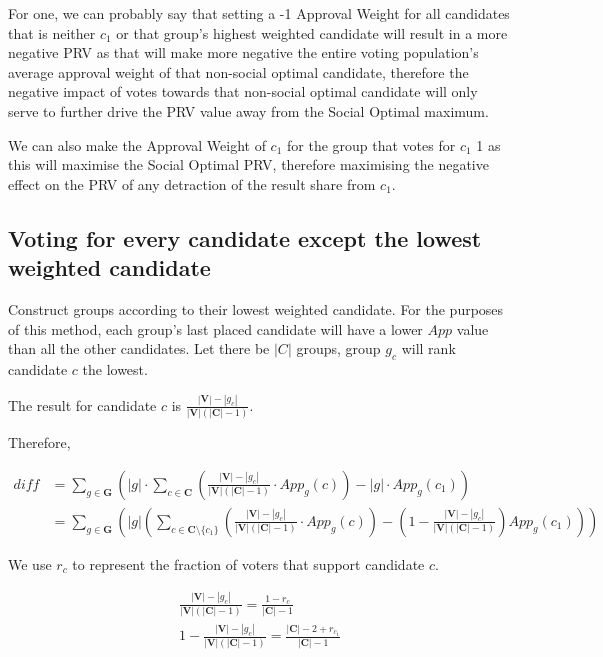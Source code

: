 \documentclass{article}
\begin{document}
For one, we can probably say that setting a -1 Approval Weight for all candidates that is neither $c_1$ or that group's highest weighted candidate will result in a more negative PRV as that will make more negative the entire voting population's average approval weight of that non-social optimal candidate, therefore the negative impact of votes towards that non-social optimal candidate will only serve to further drive the PRV value away from the Social Optimal maximum.

We can also make the Approval Weight of $c_1$ for the group that votes for $c_1$ 1 as this will maximise the Social Optimal PRV, therefore maximising the negative effect on the PRV of any detraction of the result share from $c_1$.


\subsection{Voting for every candidate except the lowest weighted candidate}

Construct groups according to their lowest weighted candidate. For the purposes of this method, each group's last placed candidate will have a lower $App$ value than all the other candidates. Let there be $|C|$ groups, group $g_c$ will rank candidate $c$ the lowest.

The result for candidate $c$ is $\frac{|\boldsymbol{V}|-|g_c|}{|\boldsymbol{V}|(|\boldsymbol{C}|-1)}$.

Therefore,

\begin{equation}
\begin{aligned}
diff &= \sum^{}_{g \in \boldsymbol{G}}{\left(|g| \cdot \sum^{}_{c \in \boldsymbol{C}}{\left(\frac{|\boldsymbol{V}|-|g_c|}{|\boldsymbol{V}|(|\boldsymbol{C}|-1)} \cdot App_g(c)\right)} - |g| \cdot App_g(c_1) \right)}\\
&= \sum^{}_{g \in \boldsymbol{G}}{\left(|g| \left( \sum^{}_{c \in \boldsymbol{C} \setminus \{c_1\}}{\left(\frac{|\boldsymbol{V}|-|g_c|}{|\boldsymbol{V}|(|\boldsymbol{C}|-1)} \cdot App_g(c)\right)} - \left(1 - \frac{|\boldsymbol{V}|-|g_c|}{|\boldsymbol{V}|(|\boldsymbol{C}|-1)}\right)App_g(c_1) \right) \right)}
\end{aligned}
\end{equation} 

We use $r_c$ to represent the fraction of voters that support candidate $c$.

\begin{gather} 
\frac{|\boldsymbol{V}|-|g_c|}{|\boldsymbol{V}|(|\boldsymbol{C}|-1)} = \frac{1-r_c}{|\boldsymbol{C}|-1} \\
1-\frac{|\boldsymbol{V}|-|g_c|}{|\boldsymbol{V}|(|\boldsymbol{C}|-1)} = \frac{|\boldsymbol{C}|-2+r_{c_1}}{|\boldsymbol{C}|-1}
\end{gather}
\end{document}

